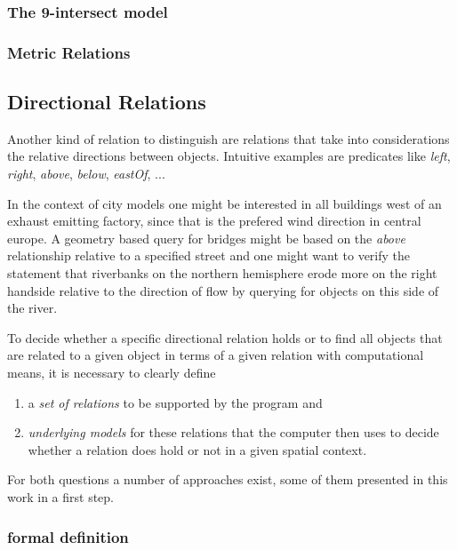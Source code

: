 \documentclass[paper=a4, fontsize=11pt]{scrartcl} %
\numberwithin{equation}{section} %
\numberwithin{figure}{section} %
\numberwithin{table}{section} %
\begin{document}
\subsubsection{The 9-intersect model}



\subsubsection{Metric Relations}\label{sec:metric-relations-1}



\subsection{Directional Relations}\label{sec:directional-relations}

Another kind of relation to distinguish are relations that take into considerations the relative directions between objects. Intuitive examples are predicates like \emph{left}, \emph{right}, \emph{above}, \emph{below}, \emph{eastOf}, ...

In the context of city models one might be interested in all buildings west of an exhaust emitting factory, since that is the prefered wind direction in central europe. A geometry based query for bridges might be based on the \emph{above} relationship relative to a specified street and one might want to verify the statement that riverbanks on the northern hemisphere erode more on the right handside relative to the direction of flow by querying for objects on this side of the river. 

To decide whether a specific directional relation holds or to find all objects that are related to a given object in terms of a given relation with computational means, it is necessary to clearly define

\begin{enumerate}
\item a \emph{set of relations} to be supported by the program and
\item \emph{underlying models} for these relations that the computer then uses to decide whether a relation does hold or not in a given spatial context. 
\end{enumerate}

For both questions a number of approaches exist, some of them presented in this work in a first step. 

\subsubsection{formal definition}
\end{document}
